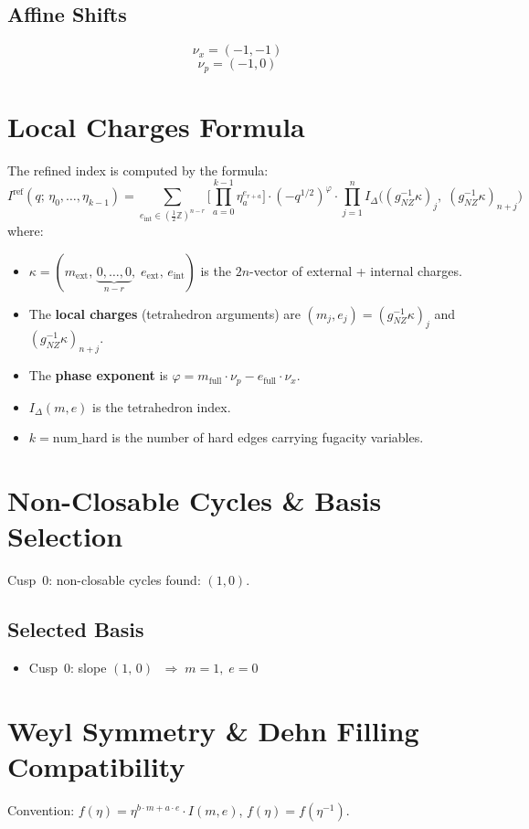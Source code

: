 \documentclass[11pt,a4paper]{article}
\begin{document}
\subsection{Affine Shifts}
$$\nu_x = (-1, -1)$$
$$\nu_p = (-1, 0)$$

\section{Local Charges Formula}
The refined index is computed by the formula:
\begin{equation}
  I^{\text{ref}}(q;\, \eta_0, \ldots, \eta_{k-1})
  = \sum_{e_{\text{int}} \in (\frac{1}{2}\mathbb{Z})^{n-r}}
    \biggl[\prod_{a=0}^{k-1} \eta_a^{e_{r+a}}\biggr]
    \cdot (-q^{1/2})^{\varphi}
    \cdot \prod_{j=1}^{n}
      I_\Delta\bigl((g_{NZ}^{-1}\kappa)_j,\;
                     (g_{NZ}^{-1}\kappa)_{n+j}\bigr)
\end{equation}
where:
\begin{itemize}
  \item $\kappa = (m_{\text{ext}},\, \underbrace{0,\ldots,0}_{n-r},\; e_{\text{ext}},\, e_{\text{int}})$ is the $2n$-vector of external + internal charges.
  \item The \textbf{local charges} (tetrahedron arguments) are $(m_j, e_j) = (g_{NZ}^{-1}\kappa)_j$ and $(g_{NZ}^{-1}\kappa)_{n+j}$.
  \item The \textbf{phase exponent} is $\varphi = m_{\text{full}} \cdot \nu_p - e_{\text{full}} \cdot \nu_x$.
  \item $I_\Delta(m, e)$ is the tetrahedron index.
  \item $k = \text{num\_hard}$ is the number of hard edges carrying fugacity variables.
\end{itemize}

\section{Non-Closable Cycles \& Basis Selection}
Cusp~0: non-closable cycles found: $(1, 0)$.

\subsection*{Selected Basis}
\begin{itemize}
  \item Cusp~0: slope $(1,\, 0)$ $\;\Rightarrow\; m = 1,\; e = 0$
\end{itemize}

\section{Weyl Symmetry \& Dehn Filling Compatibility}
Convention: $f(\eta) = \eta^{b\cdot m + a\cdot e} \cdot I(m,e)$, \quad $f(\eta) = f(\eta^{-1})$.
\end{document}
